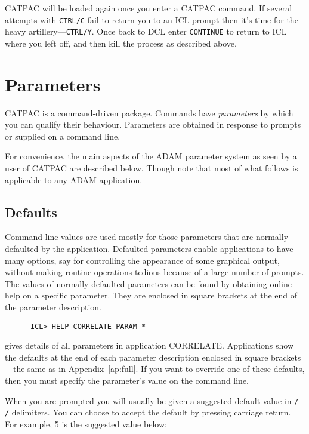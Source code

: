 {\small CATPAC} will be loaded again once you enter a {\small CATPAC} command.
If several attempts with {\tt CTRL/C} fail to return you to an {\small ICL}
prompt then it's time for the heavy artillery---{\tt CTRL/Y}.  Once back to
{\small DCL} enter {\tt CONTINUE} to return to {\small ICL} where you left off,
and then kill the process as described above. 

\section{Parameters}
\label{se:param}

{\small CATPAC} is a command-driven package.  Commands have {\em parameters\/}
by which you can qualify their behaviour. Parameters are obtained in response
to prompts or supplied on a command line.

For convenience, the main aspects of the {\small ADAM} parameter system
as seen by a user of {\small CATPAC} are described below.  Though note
that most of what follows is applicable to any {\small ADAM}
application.

\subsection{Defaults}
\label{se:defaults}

Command-line values are used mostly for those parameters that are normally
defaulted by the application.   Defaulted parameters enable applications to
have many options, say for controlling the appearance of some graphical output,
without making routine operations tedious because of a large number of prompts.
The values of normally defaulted parameters can be found by obtaining online
help on a specific parameter.  They are enclosed in square brackets at the end
of the parameter description.

\begin{verbatim}
      ICL> HELP CORRELATE PARAM *
\end{verbatim}

gives details of all parameters in application CORRELATE. Applications show the
defaults at the end of each  parameter description enclosed in square
brackets---the same as in Appendix~\ref{ap:full}. If you want to override one
of these defaults, then you must specify the parameter's value on the command
line. 

When you are prompted you will usually be given a suggested default value in
{\tt / /} delimiters.  You can choose to accept the default by pressing
carriage return.  For example, 5 is the suggested value below:


